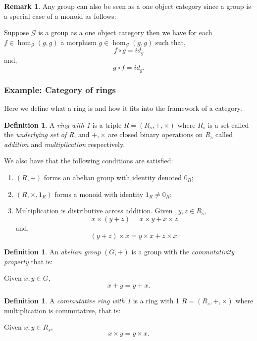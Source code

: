 \documentclass[11pt,a4paper]{article}
\theoremstyle{definition}
\newtheorem{definition}[thm]{Definition}
\newtheorem{remark}[thm]{Remark}
\newcommand\ho[3][]{\hom_{#1}(#2,#3)}
\newcommand\cat[1]{\mathscr{#1}}
\numberwithin{equation}{section}
\begin{document}
\begin{remark}
    Any group can also be seen as a one object category since a group is a special case of  a monoid as follows:
    
    Suppose $\cat{G}$ is a group as a one object category then we have for each $f\in\ho[\cat{G}]{g}{g}$ a morphism $g\in\ho[\cat{G}]{g}{g}$ such that,
    \[f\circ g = id_{g}\]
    and,
    \[g\circ f = id_{g}.\]
\end{remark}
\subsubsection{Example: Category of rings}
\label{sss:catofringsexam}
Here we define what a ring is and how it fits into the framework of a category.
\begin{definition}
\label{def:ringwith1}
A \emph{ring with 1} is a triple $R=(R_{s},+,\times)$ where $R_{s}$ is a set called the \emph{underlying set of R}, and $+,\times$ are closed binary operations on $R_{s}$ called \emph{addition} and \emph{multiplication} respectively. 

We also have that the following conditions are satisfied:
\begin{enumerate}
    \item $(R,+)$ forms an abelian group with identity denoted $0_{R}$;
    \item $(R,\times,1_{R})$ forms a monoid with identity $1_{R}\neq0_{R}$;
    \item Multiplication is distributive across addition. Given $,y,z\in R_{s}$,
    \[x\times(y+z)=x\times y +x\times z\]
    and,
    \[(y+z)\times x=y\times x +z\times x.\]
\end{enumerate}
\end{definition}
\begin{definition}
An \emph{abelian group} $(G,+)$ is a group with the \emph{commutativity property} that is: 

Given $x,y\in G$,\[x+y=y+x.\]
\end{definition}
\begin{definition}
\label{def:comringwith1}
A \emph{commutative ring with 1} is a ring with 1 $R=(R_{s},+,\times)$ where multiplication is commutative, that is:

Given $x,y\in R_{s}$,
    \[x\times y = y\times x.\]
\end{definition}
\end{document}
